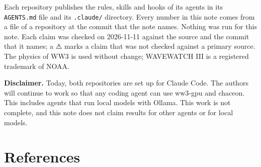 \documentclass[10pt,a4paper,]{article}
\begin{document}
Each repository publishes the rules, skills and hooks of its agents in
its \texttt{AGENTS.md} file and its \texttt{.claude/} directory. Every
number in this note comes from a file of a repository at the commit that
the note names. Nothing was run for this note. Each claim was checked on
2026-11-11 against the source and the commit that it names; a ⚠ marks a
claim that was not checked against a primary source. The physics of WW3
is used without change; WAVEWATCH III is a registered trademark of NOAA.

\textbf{Disclaimer.} Today, both repositories are set up for Claude
Code. The authors will continue to work so that any coding agent can use
ww3-gpu and chaceon. This includes agents that run local models with
Ollama. This work is not complete, and this note does not claim results
for other agents or for local models.

\section*{References}\label{references}
\end{document}
